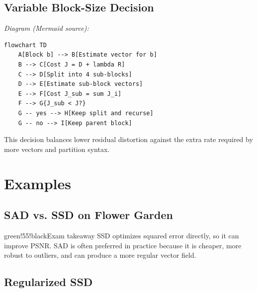\subsection{Variable Block-Size Decision}

\begin{center}\footnotesize\itshape Diagram (Mermaid source):\end{center}
\begin{verbatim}
flowchart TD
    A[Block b] --> B[Estimate vector for b]
    B --> C[Cost J = D + lambda R]
    C --> D[Split into 4 sub-blocks]
    D --> E[Estimate sub-block vectors]
    E --> F[Cost J_sub = sum J_i]
    F --> G{J_sub < J?}
    G -- yes --> H[Keep split and recurse]
    G -- no --> I[Keep parent block]
\end{verbatim}

This decision balances lower residual distortion against the extra rate required by more vectors and partition syntax.

\section{Examples}

\subsection{SAD vs. SSD on Flower Garden}

\begin{center}
\end{center}

\begin{calloutbox}{green!55!black}{Exam takeaway}
SSD optimizes squared error directly, so it can improve PSNR. SAD is often preferred in practice because it is cheaper, more robust to outliers, and can produce a more regular vector field.
\end{calloutbox}

\subsection{Regularized SSD}

